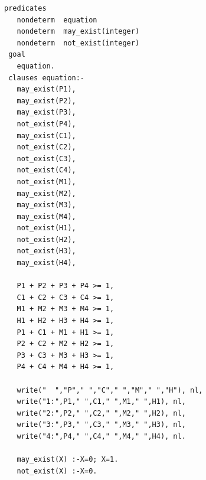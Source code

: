 \newpage

\begin{lstlisting}[style=source_code,caption=Исходный код программы на языке Visual Prolog,label=lst:visual_code]
 predicates
   nondeterm  equation
   nondeterm  may_exist(integer)
   nondeterm  not_exist(integer)         
 goal
   equation.
 clauses equation:-
   may_exist(P1),
   may_exist(P2),
   may_exist(P3),
   not_exist(P4),
   may_exist(C1),
   not_exist(C2),
   not_exist(C3),
   not_exist(C4),
   not_exist(M1),
   may_exist(M2),
   may_exist(M3),
   may_exist(M4),
   not_exist(H1),
   not_exist(H2),
   not_exist(H3),
   may_exist(H4),

   P1 + P2 + P3 + P4 >= 1,
   C1 + C2 + C3 + C4 >= 1,
   M1 + M2 + M3 + M4 >= 1,
   H1 + H2 + H3 + H4 >= 1,
   P1 + C1 + M1 + H1 >= 1,
   P2 + C2 + M2 + H2 >= 1,
   P3 + C3 + M3 + H3 >= 1,
   P4 + C4 + M4 + H4 >= 1,
    
   write("  ","P"," ","C"," ","M"," ","H"), nl,
   write("1:",P1," ",C1," ",M1," ",H1), nl, 
   write("2:",P2," ",C2," ",M2," ",H2), nl, 
   write("3:",P3," ",C3," ",M3," ",H3), nl, 
   write("4:",P4," ",C4," ",M4," ",H4), nl.  

   may_exist(X) :-X=0; X=1.
   not_exist(X) :-X=0.
\end{lstlisting}

\newpage